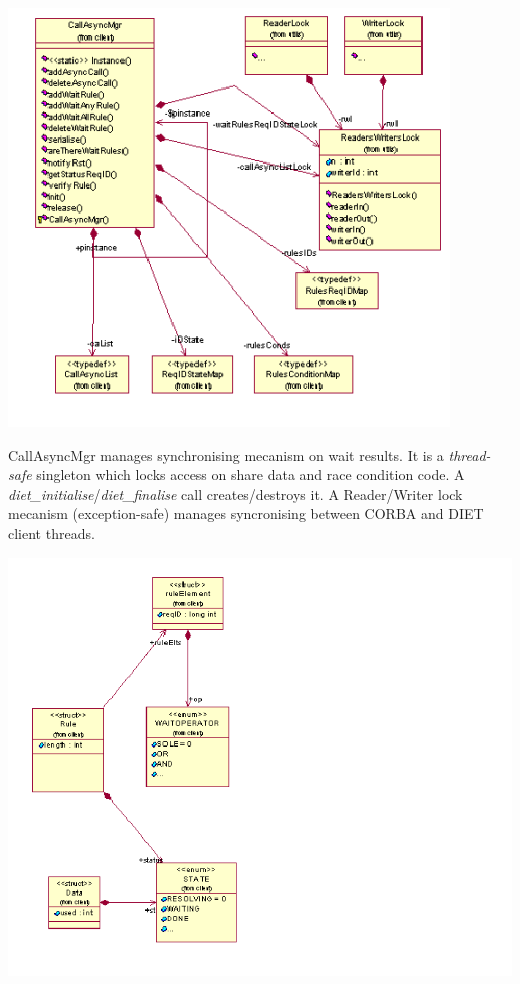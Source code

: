   \includegraphics{./fig/CallBackSynchronisationClassDiagram2}

  CallAsyncMgr manages synchronising mecanism on wait results. It is a \emph{thread-safe}
  singleton which locks access on share data and race condition code. A
  \emph{diet\_initialise}/\emph{diet\_finalise} call creates/destroys it. A
  Reader/Writer lock mecanism (exception-safe) manages syncronising between
  CORBA and DIET client threads.

  \includegraphics{./fig/WaitRulesClassDiagram}

